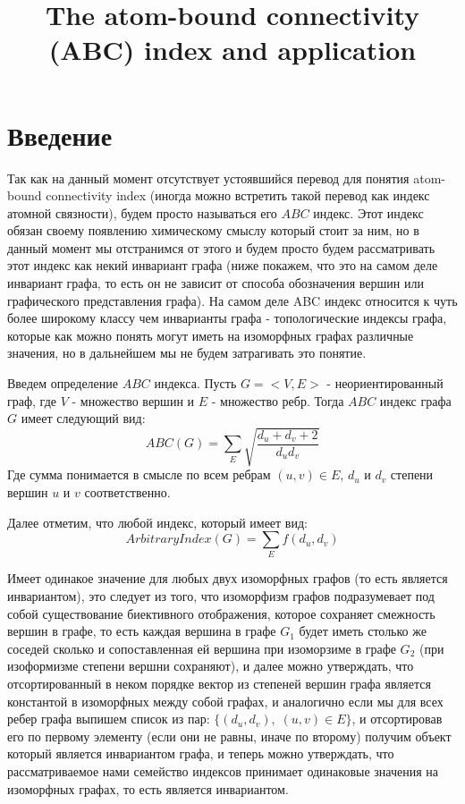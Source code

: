 \documentclass{article}
\title{The atom-bound connectivity (ABC) index and application}
\date{}
\begin{document}
\maketitle
\newpage 

\section{Введение}

Так как на данный момент отсутствует устоявшийся перевод для понятия atom-bound connectivity index (иногда можно встретить такой перевод как индекс атомной связности), будем просто называться его $ABC$ индекс. Этот индекс обязан своему появлению химическому смыслу который стоит за ним, но в данный момент мы отстранимся от этого и будем просто будем рассматривать этот индекс как некий инвариант графа (ниже покажем, что это на самом деле инвариант графа, то есть он не зависит от способа обозначения вершин или графического представления графа). На самом деле ABC индекс относится к чуть более широкому классу чем инварианты графа - топологические индексы графа, которые как можно понять могут иметь на изоморфных графах различные значения, но в дальнейшем мы не будем затрагивать это понятие.

Введем определение $ABC$ индекса. Пусть $G = <V, E>$ - неориентированный граф, где $V$ - множество вершин и $E$ - множество ребр. Тогда $ABC$ индекс графа $G$ имеет следующий вид:
$$ ABC(G) = \sum_{E} \sqrt{\frac{d_{u} + d_{v} + 2}{d_{u}d_{v}}} $$
Где сумма понимается в смысле по всем ребрам $(u, v) \in E$, $d_u$ и $d_v$ степени вершин $u$ и $v$ соответственно.

Далее отметим, что любой индекс, который имеет вид:
$$ ArbitraryIndex(G) = \sum_{E} f(d_{u}, d_{v}) $$

Имеет одинакое значение для любых двух изоморфных графов (то есть является инвариантом), это следует из того, что изоморфизм графов подразумевает под собой существование биективного отображения, которое сохраняет смежность вершин в графе, то есть каждая вершина в графе $G_1$ будет иметь столько же соседей сколько и сопоставленная ей вершина при изоморзиме в графе $G_2$ (при изоформизме степени вершни сохраняют), и далее можно утверждать, что отсортированный в неком порядке вектор из степеней вершин графа является константой в изоморфных между собой графах, и аналогично если мы для всех ребер графа выпишем список из пар: $\{(d_u, d_v), \; (u, v) \in E \}$, и отсортировав его по первому элементу (если они не равны, иначе по второму) получим объект который является инвариантом графа, и теперь можно утверждать, что рассматриваемое нами семейство индексов принимает одинаковые значения на изоморфных графах, то есть является инвариантом.
\end{document}
